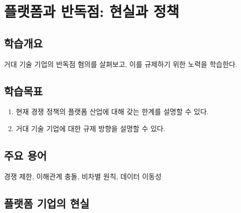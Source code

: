 \chapter{플랫폼과 반독점: 현실과 정책}\label{cha:competitionpolicy}

\section*{학습개요}
거대 기술 기업의 반독점 혐의를 살펴보고, 이를 규제하기 위한 노력을 학습한다.

\section*{학습목표}
\begin{enumerate}
\item 현재 경쟁 정책의 플랫폼 산업에 대해 갖는 한계를 설명할 수 있다.
\item 거대 기술 기업에 대한 규제 방향을 설명할 수 있다.
\end{enumerate}

\section*{주요 용어}
경쟁 제한, 이해관계 충돌, 비차별 원칙, 데이터 이동성

\pagebreak

\section{플랫폼 기업의 현실}\label{sec:}
